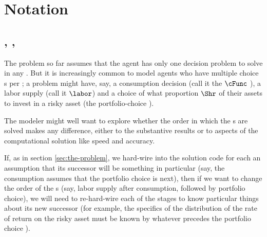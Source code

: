 
\hypertarget{notation}{}
\section{Notation}\label{sec:notation}

\subsection{\Intervals, \Stgs, \Moves}

The problem so far assumes that the agent has only one decision problem to solve in any {\interval}.  But it is increasingly common to model agents who have multiple choice {\stg}s per {\interval}; a problem might have, say, a consumption decision (call it the $\cFunc$ {\stg}), a labor supply {\stg} (call it $\labor$) and a choice of what proportion $\Shr$ of their assets to invest in a risky asset (the portfolio-choice {\stg}).

The modeler might well want to explore whether the order in which the {\stg}s are solved makes any difference, either to the substantive results or to aspects of the computational solution like speed and accuracy.

If, as in section \ref{sec:the-problem}, we hard-wire into the solution code for each {\stg} an assumption that its successor {\stg} will be something in particular (say, the consumption {\stg} assumes that the portfolio choice is next), then if we want to change the order of the {\stg}s (say, labor supply after consumption, followed by portfolio choice), we will need to re-hard-wire each of the stages to know particular things about its new successor (for example, the specifics of the distribution of the rate of return on the risky asset must be known by whatever {\stg} precedes the portfolio choice {\stg}).

